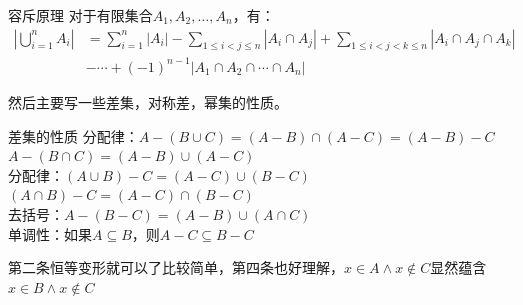 \documentclass[lang=cn,11pt]{elegantbook}
\begin{document}
\begin{theorem}{容斥原理}
对于有限集合$A_1, A_2, \ldots, A_n$，有：
\begin{align*}
\left|\bigcup_{i=1}^n A_i\right| &= \sum_{i=1}^n |A_i| 
                               - \sum_{1 \leq i < j \leq n} |A_i \cap A_j| + \sum_{1 \leq i < j < k \leq n} |A_i \cap A_j \cap A_k| \\
                               &- \cdots + (-1)^{n-1} |A_1 \cap A_2 \cap \cdots \cap A_n|
\end{align*}
\end{theorem}
然后主要写一些差集，对称差，幂集的性质。
\begin{theorem}{差集的性质}
分配律：$A - (B \cup C) = (A - B) \cap (A - C)=(A - B) - C$\quad$A - (B \cap C) = (A - B) \cup (A - C)$\\
分配律：$(A \cup B) - C = (A - C) \cup (B - C)$\quad$(A \cap B) - C = (A - C) \cap (B - C)$\\
去括号：$A - (B - C) = (A - B) \cup (A \cap C)$\\
单调性：如果$A \subseteq B$，则$A - C \subseteq B - C$
\end{theorem}
第二条恒等变形就可以了比较简单，第四条也好理解，$x\in A\land x\notin C$显然蕴含$x\in B\land x\notin C$
\end{document}
